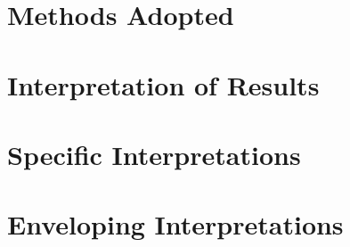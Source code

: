 \section{Methods Adopted}
\section{Interpretation of Results}
\section{Specific Interpretations}
\section{Enveloping Interpretations}